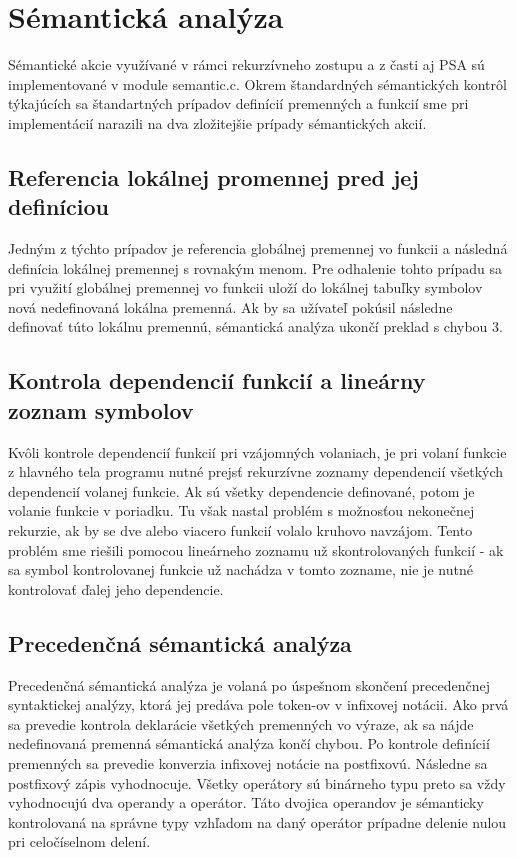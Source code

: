 \documentclass{article}
\begin{document}
	\section{Sémantická analýza}
	Sémantické akcie využívané v rámci rekurzívneho zostupu a z časti aj PSA sú implementované v module semantic.c. 
	Okrem štandardných sémantických kontrôl týkajúcích sa štandartných prípadov definícií premenných a funkcií sme pri implementácií narazili na dva zložitejšie prípady sémantických akcií.
	\subsection{Referencia lokálnej promennej pred jej definíciou}
	Jedným z týchto prípadov je referencia globálnej premennej vo funkcii a následná definícia lokálnej premennej s rovnakým menom. Pre odhalenie tohto prípadu sa pri využití globálnej premennej vo funkcii uloží do lokálnej tabuľky symbolov nová nedefinovaná lokálna premenná. Ak by sa užívateľ pokúsil následne definovať túto lokálnu premennú, sémantická analýza ukončí preklad s chybou 3.
	\subsection{Kontrola dependencií funkcií a lineárny zoznam symbolov}
	Kvôli kontrole dependencií funkcií pri vzájomných volaniach, je pri volaní funkcie z hlavného tela programu nutné prejsť rekurzívne zoznamy dependencií všetkých dependencií volanej funkcie. Ak sú všetky dependencie definované, potom je volanie funkcie v poriadku. Tu však nastal problém s možnosťou nekonečnej rekurzie, ak by se dve alebo viacero funkcií volalo kruhovo navzájom.
	Tento problém sme riešili pomocou lineárneho zoznamu už skontrolovaných funkcií - ak sa symbol kontrolovanej funkcie už nachádza v tomto zozname, nie je nutné kontrolovať ďalej jeho dependencie.
	
	\subsection{Precedenčná sémantická analýza}
	Precedenčná sémantická analýza je volaná po úspešnom skončení precedenčnej syntaktickej analýzy, ktorá jej predáva pole token-ov v infixovej notácii. Ako prvá sa prevedie kontrola deklarácie všetkých premenných vo výraze, ak sa nájde nedefinovaná premenná sémantická analýza končí chybou. Po kontrole definícií premenných sa prevedie konverzia infixovej notácie na postfixovú. Následne sa postfixový zápis vyhodnocuje. Všetky operátory sú binárneho typu preto sa vždy vyhodnocujú dva operandy a operátor. Táto dvojica operandov je sémanticky kontrolovaná na správne typy vzhľadom na  daný operátor prípadne delenie nulou pri celočíselnom delení.
	
\end{document}
